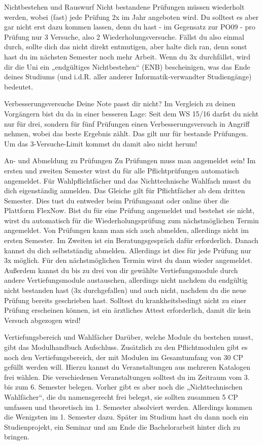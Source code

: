 Nichtbestehen und Rauswurf
Nicht bestandene Prüfungen müssen wiederholt werden, wobei (fast) jede Prüfung 2x im Jahr angeboten wird. Du solltest es aber gar nicht erst dazu kommen lassen, denn du hast - im Gegensatz zur PO09 - pro Prüfung nur 3 Versuche, also 2 Wiederholungsversuche. Fällst du also einmal durch, sollte dich das nicht direkt entmutigen, aber halte dich ran, denn sonst hast du im nächsten Semester noch mehr Arbeit. Wenn du 3x durchfällst, wird dir die Uni ein „endgültiges Nichtbestehen“ (ENB) bescheinigen, was das Ende deines Studiums (und i.d.R. aller anderer Informatik-verwandter Studiengänge) bedeutet.

Verbesserungsversuche
Deine Note passt dir nicht? Im Vergleich zu deinen Vorgängern bist du da in einer besseren Lage: Seit dem WS 15/16 darfst du nicht nur für drei, sondern für fünf Prüfungen einen Verbesserungsversuch in Angriff nehmen, wobei das beste Ergebnis zählt. Das gilt nur für bestande Prüfungen. Um das 3-Versuche-Limit kommst du damit also nicht herum!

An- und Abmeldung zu Prüfungen
Zu Prüfungen muss man angemeldet sein! Im ersten und zweiten Semester wirst du für alle Pflichtprüfungen automatisch angemeldet. Für Wahlpflichtfächer und das Nichttechnische Wahlfach musst du dich eigenständig anmelden. Das Gleiche gilt für Pflichtfächer ab dem dritten Semester. Dies tust du entweder beim Prüfungsamt oder online über die Plattform FlexNow. Bist du für eine Prüfung angemeldet und bestehst sie nicht, wirst du automatisch für die Wiederholungsprüfung zum nächstmöglichen Termin angemeldet.
Von Prüfungen kann man sich auch abmelden, allerdings nicht im ersten Semester. Im Zweiten ist ein Beratungsgespräch dafür erforderlich. Danach kannst du dich selbstständig abmelden. Allerdings ist dies für jede Prüfung nur 3x möglich. Für den nächstmöglichen Termin wirst du dann wieder angemeldet. Außerdem kannst du bis zu drei von dir gewählte Vertiefungsmodule durch andere Vertiefungsmodule austauschen, allerdings nicht nachdem du endgültig nicht bestanden hast (3x durchgefallen) und auch nicht, nachdem du die neue Prüfung bereits geschrieben hast. Solltest du krankheitsbedingt nicht zu einer Prüfung erscheinen können, ist ein ärztliches Attest erforderlich, damit dir kein Versuch abgezogen wird!

Vertiefungsbereich und Wahlfächer
Darüber, welche Module du bestehen musst, gibt das Modulhandbuch Aufschluss. Zusätzlich zu den Pflichtmodulen gibt es noch den Vertiefungsbereich, der mit Modulen im Gesamtumfang von 30 CP gefüllt werden will. Hierzu kannst du Veranstaltungen aus mehreren Katalogen frei wählen. Die verschiedenen Veranstaltungen solltest du im Zeitraum vom 3. bis zum 6. Semester belegen. Vorher gibt es aber noch die „Nichttechnischen Wahlfächer“, die du namensgerecht frei belegst, sie sollten zusammen 5 CP umfassen und  theoretisch im 1. Semester absolviert werden.  Allerdings kommen die Wenigsten im 1.  Semester dazu.
Später im Studium hast du dann noch ein Studienprojekt, ein Seminar und am Ende die Bachelorarbeit hinter dich zu bringen.

